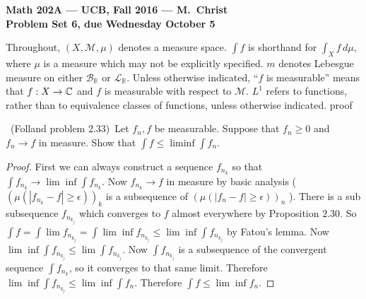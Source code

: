 \documentclass[11pt]{amsart}
\theoremstyle{definition}
\numberwithin{theorem}{section}
\numberwithin{definition}{section}
\numberwithin{equation}{section}
\def\reals{{\mathbb R}}
\def\complex{{\mathbb C}\/}
\def\scriptm{{\mathcal M}}
\def\scriptb{{\mathcal B}}
\def\scriptl{{\mathcal L}}
\begin{document}
\begin{center}{\bf Math 202A --- UCB, Fall 2016 --- M.~Christ}
\\
{\bf Problem Set 6, due Wednesday October 5}
\end{center}

\medskip
Throughout, $(X,\scriptm,\mu)$ denotes a measure space. 
$\int f$ is shorthand for $\int_X f\,d\mu$, where $\mu$ is a measure which
may not be explicitly specified. $m$ denotes Lebesgue measure on either $\scriptb_\reals$
or $\scriptl_\reals$. Unless otherwise indicated, ``$f$ is measurable'' means
that $f:X\to\complex$ and $f$ is measurable with respect to $\scriptm$.
$L^1$ refers to functions, rather than to equivalence classes of functions, unless
otherwise indicated.
proof

\medskip {}\ (Folland problem 2.33)\ 
Let $f_n,f$ be measurable.
Suppose that $f_n\ge 0$ and $f_n\to f$ in measure. 
Show that $\int f\le \liminf \int f_n$.

\begin{proof}
	First we can always construct a sequence $f_{n_k}$ so that $\int f_{n_k} \to \lim\inf \int f_{n_k}.$ Now $f_{n_k} \to f$ in measure by basic analysis ($(\mu(|f_{n_k} - f| \geq \epsilon))_k$ is a subsequence of $(\mu(|f_{n} - f| \geq \epsilon))_n$ ). 
	There is a sub subsequence $f_{n_{k_j}}$ which converges to $f$ almost everywhere by Proposition $2.30$.  
	So $\int f = \int \lim f_{n_{k_j}} = \int \lim \inf f_{n_{k_j}}  \leq \lim \inf \int {f_{n_{k_{j}}}}$ by Fatou's lemma.
	  Now $\lim \inf \int f_{n_{k_j}} \leq \lim \int f_{n_{k_j}}$. Now $\int f_{n_{k_j}}$ is a subsequence of the convergent sequence $\int f_{n_k}$, so it converges to that same limit. Therefore $\lim \inf \int {f_{n_{k_{j}}}} \leq \lim \inf \int f_n.$ Therefore $\int f \leq \lim \inf f_n$.
\end{proof}
\end{document}
